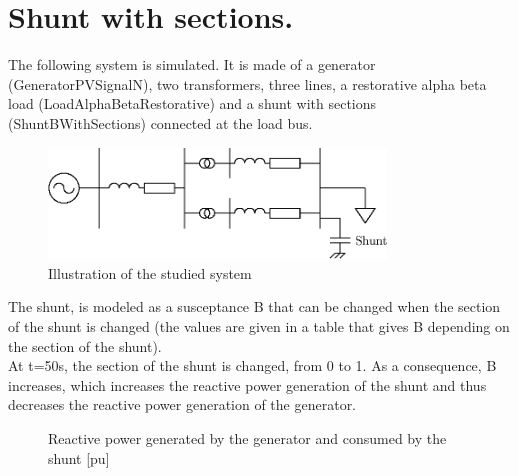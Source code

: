 \documentclass[a4paper, 12pt]{report}
\begin{document}
\chapter{Shunt with sections.}

The following system is simulated. It is made of a generator (GeneratorPVSignalN), two transformers, three lines, a restorative alpha beta load (LoadAlphaBetaRestorative) and a shunt with sections (ShuntBWithSections) connected at the load bus.\\

\begin{figure}[H]
  \begin{center}
  \includegraphics[width=0.8\textwidth]{ShuntsNoRegulation}
  \end{center}
  \caption{Illustration of the studied system}
\end{figure}

The shunt, is modeled as a susceptance B that can be changed when the section of the shunt is changed (the values are given in a table that gives B depending on the section of the shunt).\\

At t=50s, the section of the shunt is changed, from 0 to 1. As a consequence, B increases, which increases the reactive power generation of the shunt and thus decreases the reactive power generation of the generator.\\


\begin{figure}[H]
  \caption{Reactive power generated by the generator and consumed by the shunt [pu]}
\end{figure}
\end{document}
